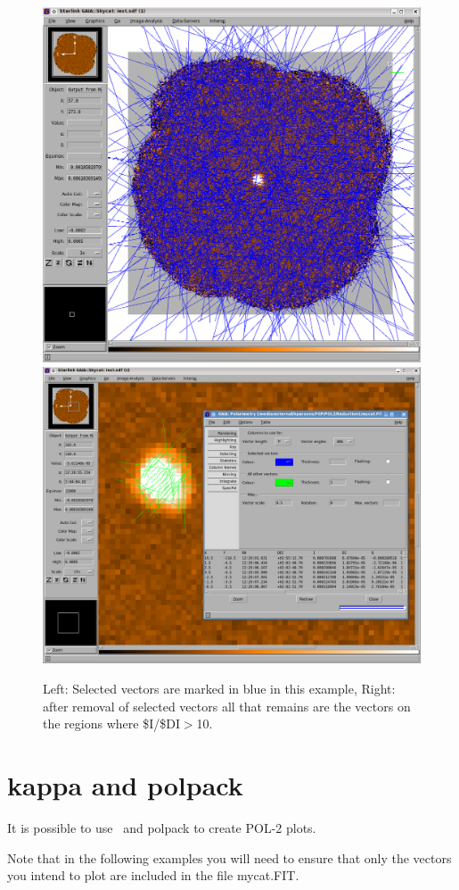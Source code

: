 \begin{figure}[t!]
\begin{center}
\includegraphics[width=0.44\linewidth]{sc22-gaia-plot-vectors-5.png}
\includegraphics[width=0.52\linewidth]{sc22-gaia-plot-vectors-7.png}
\label{fig:gaia-plot-vectors3}
\caption [Over Plotting Vectors in GAIA]{
  \small Left: Selected vectors are marked in blue in this example, Right: after removal of selected
vectors all that remains are the vectors on the regions where \$I/\$DI$>$10. 
}
\end{center}
\end{figure}


\section{kappa and polpack}

It is possible to use \Kappa\ and polpack to create POL-2 plots. 

\begin{terminalv}
\end{terminalv}

Note that in the following examples you will need to ensure that only the 
vectors you intend to plot are included in the file mycat.FIT.


